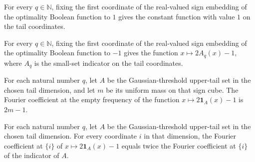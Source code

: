 \begin{theorem}
\label{FABL.firstCoordinateSlice_fknOptimalityFunction_one}
\leanok
{}
For every $q\in\mathbb N$, fixing the first coordinate of the real-valued sign embedding
of the optimality Boolean function to $1$ gives the constant function with value $1$ on
the tail coordinates.
\end{theorem}

\begin{theorem}
\label{FABL.firstCoordinateSlice_fknOptimalityFunction_neg_one}
\leanok
{}
For every $q\in\mathbb N$, fixing the first coordinate of the real-valued sign embedding
of the optimality Boolean function to $-1$ gives the function $x\mapsto 2A_q(x)-1$,
where $A_q$ is the small-set indicator on the tail coordinates.
\end{theorem}

\begin{theorem}
\label{FABL.fourierCoeff_fknOptimalityLowerSlice_empty}
\leanok
{}
For each natural number $q$, let $A$ be the Gaussian-threshold upper-tail set in the
chosen tail dimension, and let $m$ be its uniform mass on that sign cube. The Fourier
coefficient at the empty frequency of the function $x\mapsto 2\mathbf{1}_A(x)-1$ is
$2m-1$.
\end{theorem}

\begin{theorem}
\label{FABL.fourierCoeff_fknOptimalityLowerSlice_singleton}
\leanok
{}
For each natural number $q$, let $A$ be the Gaussian-threshold upper-tail set in the
chosen tail dimension. For every coordinate $i$ in that dimension, the Fourier
coefficient at $\{i\}$ of $x\mapsto 2\mathbf{1}_A(x)-1$ equals twice the Fourier
coefficient at $\{i\}$ of the indicator of $A$.
\end{theorem}

